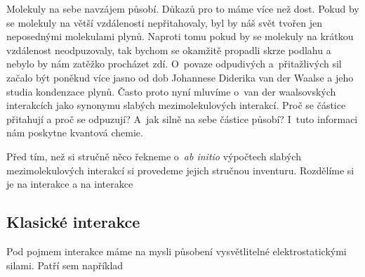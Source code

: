 Molekuly na sebe navzájem působí. Důkazů pro to máme více než dost. Pokud by se molekuly na větší vzdálenosti nepřitahovaly, byl by náš svět tvořen jen neposednými molekulami plynů. Naproti tomu pokud by se molekuly na krátkou vzdálenost neodpuzovaly, tak bychom se okamžitě propadli skrze podlahu a nebylo by nám zatěžko procházet zdí. O~povaze odpudivých a~přitažlivých sil začalo být poněkud více jasno od dob Johannese Diderika van der Waalse a jeho studia kondenzace plynů. Často proto nyní mluvíme o~van der waalsovských interakcích jako synonymu slabých mezimolekulových interakcí. Proč se částice přitahují a proč se odpuzují? A~jak silně na sebe částice působí? I~tuto informaci nám poskytne kvantová chemie.

Před tím, než si stručně něco řekneme o~\textit{ab initio} výpočtech slabých mezimolekulových interakcí si provedeme jejich stručnou inventuru. Rozdělíme si je na  interakce a na interakce 


\subsection{Klasické interakce}
Pod pojmem  interakce máme na mysli působení vysvětlitelné elektrostatickými silami. Patří sem například

